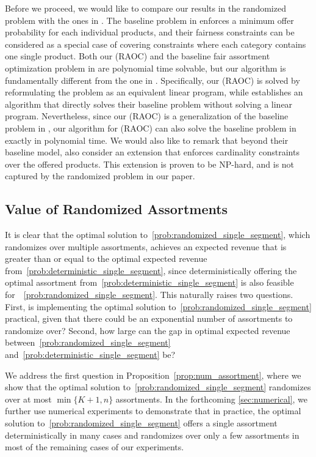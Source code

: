 \documentclass[msom,non-blindrev]{informs3} %
\theoremstyle{definition}
\begin{document}
{  Before we proceed, we would like to compare our results in the randomized problem with the ones in \cite{lu2023simple}. The baseline problem in \cite{lu2023simple} enforces a minimum offer probability for each individual products, and their fairness constraints can be considered as a special case of covering constraints where each category contains one single product. Both our (RAOC) and the baseline fair assortment optimization problem in \cite{lu2023simple} are polynomial time solvable, but our algorithm is fundamentally different from the one in \cite{lu2023simple}. Specifically, our (RAOC) is solved by reformulating the problem as an equivalent linear program, while \cite{lu2023simple} establishes an algorithm that directly solves their baseline problem without solving a linear program. Nevertheless, since our (RAOC) is a generalization of the baseline problem in \cite{lu2023simple}, our algorithm for (RAOC) can also solve the baseline problem in \cite{lu2023simple} exactly in polynomial time. We would also like to remark that beyond their baseline model, \cite{lu2023simple} also consider an extension that enforces cardinality constraints over the offered products. This extension is proven to be NP-hard, and is not captured by the randomized problem in our paper.}

\subsection{Value of Randomized Assortments}\label{sec:value_randomized}


It is clear that the optimal solution to~\eqref{prob:randomized_single_segment}, which randomizes over multiple assortments, achieves an expected revenue that is greater than or equal to the optimal expected revenue from~\eqref{prob:deterministic_single_segment}, since deterministically offering the optimal assortment from~\eqref{prob:deterministic_single_segment} is also feasible for~~\eqref{prob:randomized_single_segment}.
This naturally raises two questions. First, is implementing the optimal solution to~\eqref{prob:randomized_single_segment} practical, given that there could be an exponential number of assortments to randomize over? Second, how large can the gap in optimal expected revenue between~\eqref{prob:randomized_single_segment} and~\eqref{prob:deterministic_single_segment} be?

We address the first question in Proposition~\ref{prop:num_assortment}, where we show that the optimal solution to~\eqref{prob:randomized_single_segment} randomizes over at most $\min\{K+1,n\}$ assortments. In the forthcoming \cref{sec:numerical}, we further use numerical experiments to demonstrate that in practice, the optimal solution to~\eqref{prob:randomized_single_segment} offers a single assortment deterministically in many cases and randomizes over only a few assortments in most of the remaining cases of our experiments.
\end{document}
